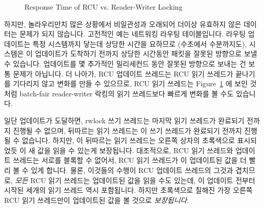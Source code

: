 \fi

\begin{figure}[tb]
\centering
{}
\caption{Response Time of RCU vs. Reader-Writer Locking}
\label{fig:defer:Response Time of RCU vs. Reader-Writer Locking}
\end{figure}

하지만, 놀라우리만치 많은 상황에서 비일관성과 오래되어 더이상 유효하지 않은
데이터는 문제가 되지 않습니다.
고전적인 예는 네트워킹 라우팅 테이블입니다.
라우팅 업데이트는 특정 시스템까지 닿는데 상당한 시간을 요하므로 (수초에서
수분까지도), 시스템은 이 업데이트가 도착하기 전까지 상당한 시간동안 패킷을
잘못된 방향으로 보낼 수 있습니다.
업데이트를 몇 추가적인 밀리세컨드 동안 잘못된 방향으로 보내는 건 보통 문제가
아닙니다.
더 나아가, RCU 업데이트 쓰레드는 RCU 읽기 쓰레드가 끝나기를 기다리지 않고
변화를 만들 수 있으므로, RCU 읽기 쓰레드는
Figure~\ref{fig:defer:Response Time of RCU vs. Reader-Writer Locking}
에 보인 것처럼 batch-fair reader-writer 락킹의 읽기 쓰레드보다 빠르게 변화를 볼
수도 있습니다.

일단 업데이트가 도달하면, rwlock 쓰기 쓰레드는 마지막 읽기 쓰레드가 완료되기
전까지 진행될 수 없으며, 뒤따르는 읽기 쓰레드는 이 쓰기 쓰레드가 완료되기
전까지 진행될 수 없습니다.
하지만, 이 뒤따르는 읽기 쓰레드는 오른쪽 상자의 초록색으로 표시되었듯 이 새
값을 읽을 수 있는게 보장됩니다.
대조적으로, RCU 읽기 쓰레드와 업데이트 쓰레드는 서로를 블록할 수 없어서, RCU
읽기 쓰레드가 이 업데이트된 값을 더 빨리 볼 수 있게 합니다.
물론, 이것들의 수행이 RCU 업데이트 쓰레드의 그것과 겹치므로, \emph{모든} RCU
읽기 쓰레드는 업데이트된 값을 읽을 수도 있는데, 이 업데이트 전부터 시작된
세개의 읽기 쓰레드 역시 포함됩니다.
하지만 초록색으로 칠해진 가장 오른쪽 RCU 읽기 쓰레드만이 업데이트된 값을 볼
것으로 \emph{보장됩니다}.

